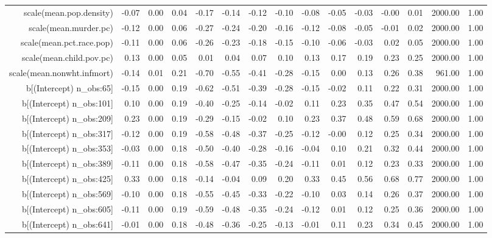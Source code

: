 \begin{table}[ht]
\begin{tabular}{rrrrrrrrrrrrrrr}
  scale(mean.pop.density) & -0.07 & 0.00 & 0.04 & -0.17 & -0.14 & -0.12 & -0.10 & -0.08 & -0.05 & -0.03 & -0.00 & 0.01 & 2000.00 & 1.00 \\ 
  scale(mean.murder.pc) & -0.12 & 0.00 & 0.06 & -0.27 & -0.24 & -0.20 & -0.16 & -0.12 & -0.08 & -0.05 & -0.01 & 0.02 & 2000.00 & 1.00 \\ 
  scale(mean.pct.race.pop) & -0.11 & 0.00 & 0.06 & -0.26 & -0.23 & -0.18 & -0.15 & -0.10 & -0.06 & -0.03 & 0.02 & 0.05 & 2000.00 & 1.00 \\ 
  scale(mean.child.pov.pc) & 0.13 & 0.00 & 0.05 & 0.01 & 0.04 & 0.07 & 0.10 & 0.13 & 0.17 & 0.19 & 0.23 & 0.25 & 2000.00 & 1.00 \\ 
  scale(mean.nonwht.infmort) & -0.14 & 0.01 & 0.21 & -0.70 & -0.55 & -0.41 & -0.28 & -0.15 & 0.00 & 0.13 & 0.26 & 0.38 & 961.00 & 1.00 \\ 
  b[(Intercept) n\_obs:65] & -0.15 & 0.00 & 0.19 & -0.62 & -0.51 & -0.39 & -0.28 & -0.15 & -0.02 & 0.11 & 0.22 & 0.31 & 2000.00 & 1.00 \\ 
  b[(Intercept) n\_obs:101] & 0.10 & 0.00 & 0.19 & -0.40 & -0.25 & -0.14 & -0.02 & 0.11 & 0.23 & 0.35 & 0.47 & 0.54 & 2000.00 & 1.00 \\ 
  b[(Intercept) n\_obs:209] & 0.23 & 0.00 & 0.19 & -0.29 & -0.15 & -0.02 & 0.10 & 0.23 & 0.37 & 0.48 & 0.59 & 0.68 & 2000.00 & 1.00 \\ 
  b[(Intercept) n\_obs:317] & -0.12 & 0.00 & 0.19 & -0.58 & -0.48 & -0.37 & -0.25 & -0.12 & -0.00 & 0.12 & 0.25 & 0.34 & 2000.00 & 1.00 \\ 
  b[(Intercept) n\_obs:353] & -0.03 & 0.00 & 0.18 & -0.50 & -0.40 & -0.28 & -0.16 & -0.04 & 0.10 & 0.21 & 0.32 & 0.44 & 2000.00 & 1.00 \\ 
  b[(Intercept) n\_obs:389] & -0.11 & 0.00 & 0.18 & -0.58 & -0.47 & -0.35 & -0.24 & -0.11 & 0.01 & 0.12 & 0.23 & 0.33 & 2000.00 & 1.00 \\ 
  b[(Intercept) n\_obs:425] & 0.33 & 0.00 & 0.18 & -0.14 & -0.04 & 0.09 & 0.20 & 0.33 & 0.45 & 0.56 & 0.68 & 0.77 & 2000.00 & 1.00 \\ 
  b[(Intercept) n\_obs:569] & -0.10 & 0.00 & 0.18 & -0.55 & -0.45 & -0.33 & -0.22 & -0.10 & 0.03 & 0.14 & 0.26 & 0.37 & 2000.00 & 1.00 \\ 
  b[(Intercept) n\_obs:605] & -0.11 & 0.00 & 0.19 & -0.59 & -0.48 & -0.35 & -0.24 & -0.12 & 0.01 & 0.12 & 0.25 & 0.36 & 2000.00 & 1.00 \\ 
  b[(Intercept) n\_obs:641] & -0.01 & 0.00 & 0.18 & -0.48 & -0.36 & -0.25 & -0.13 & -0.01 & 0.11 & 0.23 & 0.34 & 0.45 & 2000.00 & 1.00 \\ 

\end{tabular}
\end{table}
